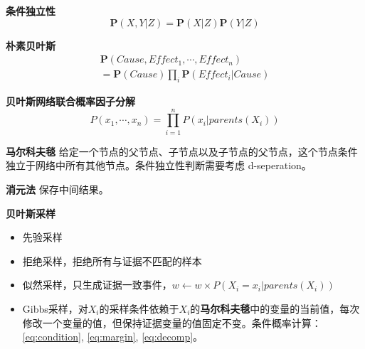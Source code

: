 \documentclass[10pt,a4paper]{ctexart}
\begin{document}
\begin{multicols}{3}
        \textbf{条件独立性}
        \begin{equation*}
            \mathbf{P}(X,Y|Z) = \mathbf{P}(X|Z)\mathbf{P}(Y|Z)
        \end{equation*}

        \textbf{朴素贝叶斯}
        \begin{multline*}
            \mathbf{P}(\mathit{Cause,Effect_1,\cdots,Effect_n})\\
            =\mathbf{P}(\mathit{Cause})\prod_{i}\mathbf{P}(\mathit{Effect_i|Cause})
        \end{multline*}

        \textbf{贝叶斯网络联合概率因子分解}
        \begin{equation}\label{eq:decomp}
            P(x_1,\cdots,x_n)=\prod_{i=1}^nP(x_i|parents(X_i))
        \end{equation}

        \textbf{马尔科夫毯}
        给定一个节点的父节点、子节点以及子节点的父节点，这个节点条件独立于网络中所有其他节点。条件独立性判断需要考虑 d-seperation。

        \textbf{消元法}
        保存中间结果。

        \textbf{贝叶斯采样}
        \begin{itemize}
            \item 先验采样
            \item 拒绝采样，拒绝所有与证据不匹配的样本
            \item 似然采样，只生成证据一致事件，$w\leftarrow w\times P(X_i=x_i|parents(X_i))$
            \item Gibbs采样，对$X_i$的采样条件依赖于$X_i$的\textbf{马尔科夫毯}中的变量的当前值，每次修改一个变量的值，但保持证据变量的值固定不变。条件概率计算：\eqref{eq:condition}, \eqref{eq:margin}, \eqref{eq:decomp}。
        \end{itemize}


\end{multicols}
\end{document}
